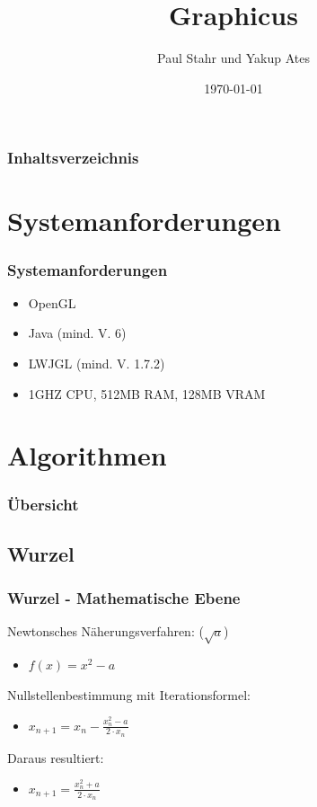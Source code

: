 \documentclass{beamer}
\begin{document}
\title{Graphicus}   
\author{Paul Stahr und Yakup Ates} 
\date{\today}

\begin{frame}
\titlepage
\end{frame}

\begin{frame}[allowframebreaks]
\frametitle{Inhaltsverzeichnis}\tableofcontents
\end{frame}
\section{Systemanforderungen}
\begin{frame}\frametitle{Systemanforderungen}
 \begin{itemize}
  \item OpenGL 
  \item Java (mind. V. 6)
  \item LWJGL (mind. V. 1.7.2)
  \item 1GHZ CPU, 512MB RAM, 128MB VRAM
 \end{itemize}
\end{frame}

\section{Algorithmen}

  \begin{frame}[shrink]
    \frametitle{Übersicht}
    \tableofcontents[currentsection]
  \end{frame}

\subsection{Wurzel} 
\begin{frame}\frametitle{Wurzel - Mathematische Ebene} 
Newtonsches N\"aherungsverfahren: ($ \sqrt a $)
\begin{itemize}
 \item $ f(x) = x^2 - a $
\end{itemize}

Nullstellenbestimmung mit Iterationsformel:
\begin{itemize}
 \item $ x_{n+1} = x_n - \frac{x^2_n - a}{2 \cdot x_n} $
\end{itemize}

 Daraus resultiert:
\begin{itemize}
 \item $ x_{n+1} = \frac{ x^2_n + a}{2 \cdot x_n } \qquad $
\end{itemize}
\end{frame}
\end{document}
